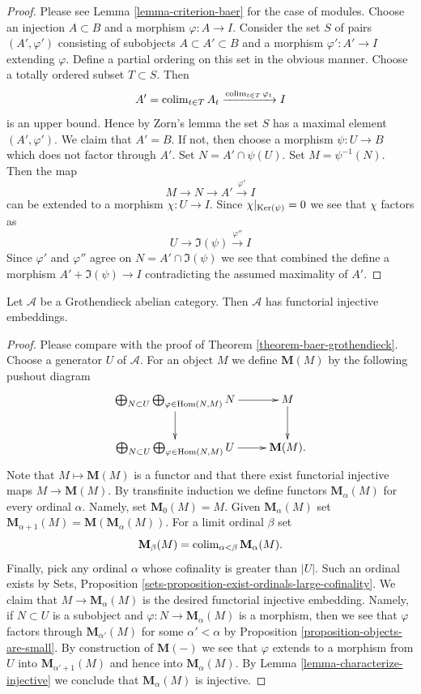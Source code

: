 \begin{proof}
Please see Lemma \ref{lemma-criterion-baer} for the case of modules.
Choose an injection $A \subset B$ and a morphism $\varphi : A \to I$.
Consider the set $S$ of pairs $(A', \varphi')$ consisting of
subobjects $A \subset A' \subset B$ and a morphism $\varphi' : A' \to I$
extending $\varphi$. Define a partial ordering on this set in the obvious
manner. Choose a totally ordered subset $T \subset S$. Then
$$
A' = \mathop{\mathrm{colim}}\nolimits_{t \in T} A_t \xrightarrow{\mathop{\mathrm{colim}}\nolimits_{t \in T} \varphi_t} I
$$
is an upper bound. Hence by Zorn's lemma the set $S$ has a maximal element
$(A', \varphi')$. We claim that $A' = B$. If not, then choose a morphism
$\psi : U \to B$ which does not factor through $A'$. Set
$N = A' \cap \psi(U)$. Set $M = \psi^{-1}(N)$. Then the map
$$
M \to N \to A' \xrightarrow{\varphi'} I
$$
can be extended to a morphism $\chi : U \to I$. Since
$\chi|_{\mathop{\mathrm{Ker}}(\psi)} = 0$ we see that $\chi$ factors as
$$
U \to \Im(\psi) \xrightarrow{\varphi''} I
$$
Since $\varphi'$ and $\varphi''$ agree on $N = A' \cap \Im(\psi)$
we see that combined the define a morphism $A' + \Im(\psi) \to I$
contradicting the assumed maximality of $A'$.
\end{proof}

\begin{theorem}
\label{theorem-injective-embedding-grothendieck}
Let $\mathcal{A}$ be a Grothendieck abelian category.
Then $\mathcal{A}$ has functorial injective embeddings.
\end{theorem}

\begin{proof}
Please compare with the proof of
Theorem \ref{theorem-baer-grothendieck}.
Choose a generator $U$ of $\mathcal{A}$. For an object $M$ we define
$\mathbf{M}(M)$ by the following pushout diagram
$$
\xymatrix{
\bigoplus_{N \subset U}
\bigoplus_{\varphi \in \Hom(N, M)}
N \ar[r] \ar[d] & M \ar[d] \\
\bigoplus_{N \subset U}
\bigoplus_{\varphi \in \Hom(N, M)}
U \ar[r] &  \mathbf{M}(M).
}
$$
Note that $M \mapsto \mathbf{M}(M)$ is a functor and that there
exist functorial injective maps $M \to \mathbf{M}(M)$. By transfinite
induction we define functors $\mathbf{M}_\alpha(M)$ for every
ordinal $\alpha$. Namely, set $\mathbf{M}_0(M) = M$. Given
$\mathbf{M}_\alpha(M)$ set
$\mathbf{M}_{\alpha + 1}(M) = \mathbf{M}(\mathbf{M}_\alpha(M))$.
For a limit ordinal $\beta$ set
$$
\mathbf{M}_\beta(M) = \mathop{\mathrm{colim}}\nolimits_{\alpha < \beta} \mathbf{M}_\alpha(M).
$$
Finally, pick any ordinal $\alpha$ whose cofinality is greater than $|U|$.
Such an ordinal exists by
Sets, Proposition \ref{sets-proposition-exist-ordinals-large-cofinality}.
We claim that $M \to \mathbf{M}_\alpha(M)$ is the desired functorial
injective embedding. Namely, if $N \subset U$ is a subobject and
$\varphi : N \to \mathbf{M}_\alpha(M)$ is a morphism, then we see that
$\varphi$ factors through $\mathbf{M}_{\alpha'}(M)$ for some
$\alpha' < \alpha$ by
Proposition \ref{proposition-objects-are-small}.
By construction of $\mathbf{M}(-)$ we see that $\varphi$ extends to
a morphism from $U$ into $\mathbf{M}_{\alpha' + 1}(M)$ and hence into
$\mathbf{M}_\alpha(M)$. By
Lemma \ref{lemma-characterize-injective}
we conclude that $\mathbf{M}_\alpha(M)$ is injective.
\end{proof}


